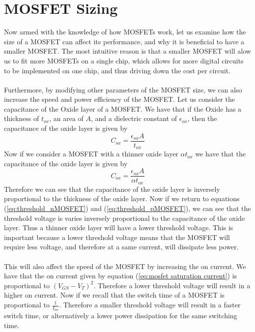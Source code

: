 \documentclass[
  reprint,
  amsmath,amssymb,
  aps
]{revtex4-1}
\begin{document}
\section{\label{sec:level1}MOSFET Sizing}
Now armed with the knowledge of how MOSFETs work, let us examine how the size of a MOSFET can affect its performance, and why 
it is beneficial to have a smaller MOSFET. The most intuitive reason is that a smaller MOSFET will alow us to fit more MOSFETs
on a single chip, which allows for more digital circuits to be implemented on 
one chip, and thus driving down the cost per circuit.\\\\
Furthermore, by modifying other parameters of the MOSFET size, we
can also increase the speed and power efficiency of the MOSFET. 
Let us consider the capacitance of the Oxide layer of a MOSFET. We have that if the Oxide has a thickness of $t_{ox}$, 
an area of $A$, and a dielectric constant of $\epsilon_{ox}$, then the capacitance of the oxide layer is given by
\begin{equation}
  C_{ox} = \frac{\epsilon_{ox}A}{t_{ox}}
\end{equation}
Now if we consider a MOSFET with a thinner oxide layer $\alpha t_{ox}$ we 
have that the capacitance of the oxide layer is given by
\begin{equation}
  C_{ox} = \frac{\epsilon_{ox}A}{\alpha t_{ox}}
\end{equation}
Therefore we can see that the capacitance of the oxide layer is inversely proportional to the thickness of the oxide layer. Now if we return to 
equations (\ref{eq:threshold_nMOSFET}) and (\ref{eq:threshold_pMOSFET}), we can see that the threshold voltage is varies inversely proportional to the capacitance of the oxide layer. 
Thus a thinner oxide layer will have a lower threshold voltage. This is important because a lower threshold voltage means that the MOSFET will require less voltage, and therefore 
at a same current, will dissipate less power.\cite{ChenmingHu6}\\\\
This will also affect the speed of the MOSFET by increasing the on current. We have that the on current given by 
equation (\ref{eq:mosfet saturation current}) is proportional to $(V_{GS}-V_{T})^{2}$. Therefore a lower threshold voltage will result in 
a higher on current. Now if we recall that the switch time of a MOSFET is proportional to $\frac{1}{I_{on}}$. Therefore 
a smaller threshold voltage will result in a faster switch time, or alternatively a lower power dissipation for the 
same switching time.\cite{ChenmingHu6}\\\\
\end{document}
